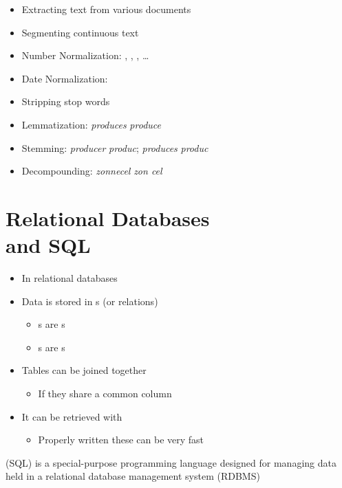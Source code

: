 \documentclass[a4paper,landscape,headrule,footrule,xetex]{foils}
\begin{document}
\begin{itemize}
\item Extracting text from various documents
\item Segmenting continuous text
\item Number Normalization:  
  , , ,  \ldots
\item Date Normalization:    
\item Stripping stop words
\item Lemmatization:  \textit{produces}   \infers \textit{produce}
\item Stemming:  \textit{producer}   \infers \textit{produc}; \textit{produces}   \infers \textit{produc}
\item Decompounding: \textit{zonnecel}  \infers \textit{zon cel}
\end{itemize}


\section{Relational Databases \\ and SQL}


\begin{itemize}
\item In relational databases
\item Data is stored in s (or relations)
  \begin{itemize}
  \item {}s are  s
  \item {}s are s
  \end{itemize}
    \item Tables can be joined together
  \begin{itemize}
  \item If they share a common column
  \end{itemize}
\item It can be retrieved with 
  \begin{itemize}
  \item Properly written these can be very fast
  \end{itemize}
\end{itemize}
 (SQL) is a special-purpose
programming language designed for managing data held in a relational
database management system (RDBMS)
\end{document}
